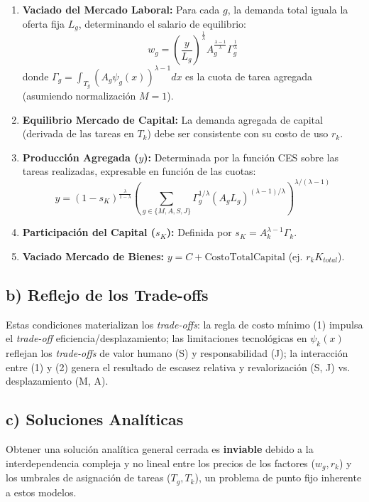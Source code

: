 \documentclass{article}
\theoremstyle{remark}
\theoremstyle{definition}
\begin{document}
\begin{enumerate}
\begin{tcolorbox}[title= Solución Punto 4 (Revisado y Justificado)]
\begin{enumerate}
    \item \textbf{Vaciado del Mercado Laboral:} Para cada $g$, la demanda total iguala la oferta fija $L_g$, determinando el salario de equilibrio:
        \[ w_g = \left( \frac{y}{L_g} \right)^{\frac{1}{\lambda}} A_g^{\frac{\lambda-1}{\lambda}} \Gamma_g^{\frac{1}{\lambda}} \]
        donde $\Gamma_g = \int_{T_g} (A_g \psi_g(x))^{\lambda-1} dx$ es la cuota de tarea agregada (asumiendo normalización $M=1$).

    \item \textbf{Equilibrio Mercado de Capital:} La demanda agregada de capital (derivada de las tareas en $T_k$) debe ser consistente con su costo de uso $r_k$.

    \item \textbf{Producción Agregada ($y$):} Determinada por la función CES sobre las tareas realizadas, expresable en función de las cuotas:
        \[ y = (1 - s_K)^{\frac{\lambda}{1-\lambda}} \left( \sum_{g \in \{M, A, S, J\}} \Gamma_g^{1/\lambda} (A_g L_g)^{(\lambda-1)/\lambda} \right)^{\lambda/(\lambda-1)} \]

    \item \textbf{Participación del Capital ($s_K$):} Definida por $s_K = A_k^{\lambda-1} \Gamma_k$.

    \item \textbf{Vaciado Mercado de Bienes:} $y = C + \text{CostoTotalCapital}$ (ej. $r_k K_{total}$).
\end{enumerate}

\subsection*{b) Reflejo de los Trade-offs}

Estas condiciones materializan los \textit{trade-offs}: la regla de costo mínimo (1) impulsa el \textit{trade-off} eficiencia/desplazamiento; las limitaciones tecnológicas en $\psi_k(x)$ reflejan los \textit{trade-offs} de valor humano (S) y responsabilidad (J); la interacción entre (1) y (2) genera el resultado de escasez relativa y revalorización (S, J) vs. desplazamiento (M, A).

\subsection*{c) Soluciones Analíticas}

Obtener una solución analítica general cerrada es \textbf{inviable} debido a la interdependencia compleja y no lineal entre los precios de los factores ($w_g, r_k$) y los umbrales de asignación de tareas ($T_g, T_k$), un problema de punto fijo inherente a estos modelos.


\end{tcolorbox}
\end{enumerate}
\end{document}

